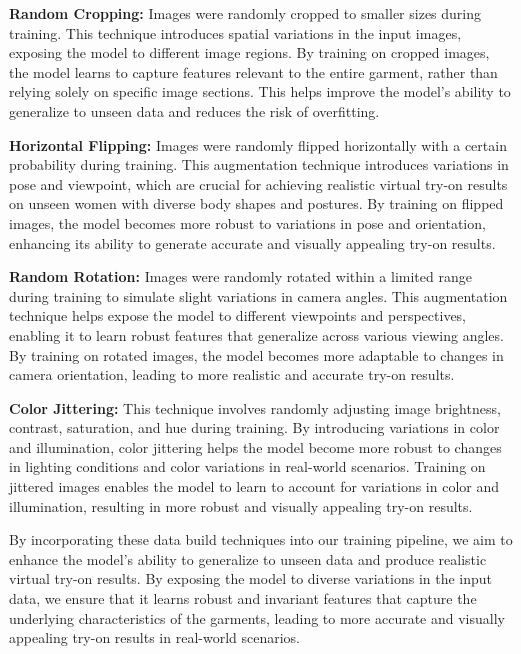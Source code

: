 \textbf{Random Cropping:} Images were randomly cropped to smaller sizes during training. This technique introduces spatial variations in the input images, exposing the model to different image regions. By training on cropped images, the model learns to capture features relevant to the entire garment, rather than relying solely on specific image sections. This helps improve the model's ability to generalize to unseen data and reduces the risk of overfitting.

\textbf{Horizontal Flipping:} Images were randomly flipped horizontally with a certain probability during training. This augmentation technique introduces variations in pose and viewpoint, which are crucial for achieving realistic virtual try-on results on unseen women with diverse body shapes and postures. By training on flipped images, the model becomes more robust to variations in pose and orientation, enhancing its ability to generate accurate and visually appealing try-on results.

\textbf{Random Rotation:} Images were randomly rotated within a limited range during training to simulate slight variations in camera angles. This augmentation technique helps expose the model to different viewpoints and perspectives, enabling it to learn robust features that generalize across various viewing angles. By training on rotated images, the model becomes more adaptable to changes in camera orientation, leading to more realistic and accurate try-on results.

\textbf{Color Jittering:} This technique involves randomly adjusting image brightness, contrast, saturation, and hue during training. By introducing variations in color and illumination, color jittering helps the model become more robust to changes in lighting conditions and color variations in real-world scenarios. Training on jittered images enables the model to learn to account for variations in color and illumination, resulting in more robust and visually appealing try-on results.

By incorporating these data build techniques into our training pipeline, we aim to enhance the model's ability to generalize to unseen data and produce realistic virtual try-on results. By exposing the model to diverse variations in the input data, we ensure that it learns robust and invariant features that capture the underlying characteristics of the garments, leading to more accurate and visually appealing try-on results in real-world scenarios.

